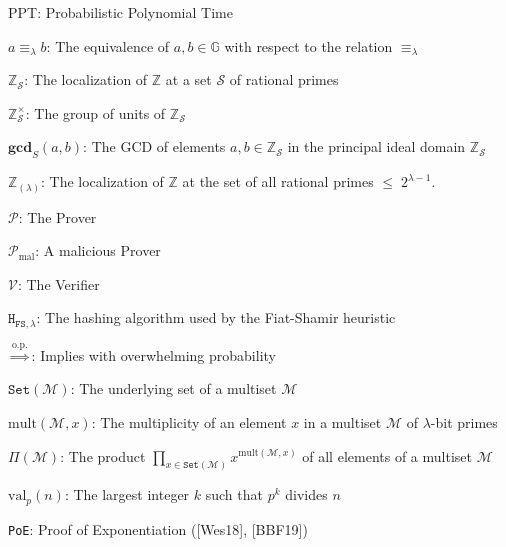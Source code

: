 \documentclass[11pt, lettersize, notitlepage, leqno, footskip=0.6cm]{article}
\newcommand{\bz}{\mathbb Z}
\newcommand{\pl}{\prod\limits}
\newcommand{\ttt}{\texttt}
\newcommand{\sett}{\ttt{Set}}
\newcommand{\eqlam}{\equiv_{\lam}}
\newcommand{\mc}{\mathcal}
\newcommand{\mb}{\mathbb}
\newcommand{\mbf}{\mathbf}
\newcommand{\mr}{\mathrm}
\newcommand{\lam}{\lambda}
\newcommand{\bzs}{\bz_{\mc{S}}}
\newcommand{\noin}{\noindent}
\newcommand{\GCD}{\mbf{gcd}}
\numberwithin{equation}{section}
\begin{document}
{{{\noin PPT: Probabilistic Polynomial Time \vspace{0.1cm}

\noin $a\eqlam b$: The equivalence of $a,b\in\mb{G}$ with respect to the relation $\eqlam$ \vspace{0.1cm}

\noin $\bz_{\mc{S}}$: The localization of $\bz$ at a set $\mc{S}$ of rational primes \vspace{0.1cm}

\noin $\bzs^{\times}$: The group of units of $\bzs$ \vspace{0.1cm}

\noin $\GCD_S(a, b)$: The GCD of elements $a,b\in \bz_{\mc{S}}$ in the principal ideal domain $\bz_{\mc{S}}$ \vspace{0.1cm}

\noin $\bz_{(\lam)}$: The localization of $\bz$ at the set of all rational primes $\leq\; 2^{\lam-1}$. \vspace{0.1cm}

\noin $\mc{P}$: The Prover \vspace{0.1cm}

\noin $\mc{P}_{\mr{mal}}$: A malicious Prover \vspace{0.1cm}

\noin $\mc{V}$: The Verifier \vspace{0.1cm}

\noin $\ttt{H}_{\ttt{FS}, \lam}$: The hashing algorithm used by the Fiat-Shamir heuristic \vspace{0.1cm}

\noin $\overset{\mr{o.p.}}{\Longrightarrow}$: Implies with overwhelming probability \vspace{0.1cm}

\noin $\sett(\mc{M})$: The underlying set of a multiset $\mc{M}$ \vspace{0.1cm}

\noin $\mr{mult}(\mc{M},x)$: The multiplicity of an element $x$ in a multiset $\mc{M}$ of $\lam$-bit primes \vspace{0.1cm}

\noin $\Pi(\mc{M})$: The product $\pl_{x\in \sett(\mc{M})} x^{\mr{mult}(\mc{M},x)}$ of all elements of a multiset $\mc{M}$ \vspace{0.1cm}

\noin $\mr{val}_p(n)$: The largest integer $k$ such that $p^k$ divides $n$ \vspace{0.1cm}

\noin \verb|PoE|: Proof of Exponentiation ([Wes18], [BBF19])\vspace{0.1cm}

}}}
\end{document}
